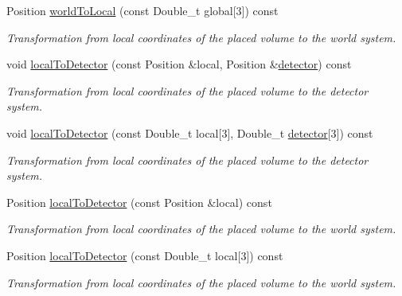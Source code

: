 \begin{DoxyCompactItemize}
Position \hyperlink{class_d_d4hep_1_1_alignments_1_1_alignment_data_af6e227ee69afb3dbf1d50463c12ec106}{world\+To\+Local} (const Double\+\_\+t global\mbox{[}3\mbox{]}) const
\begin{DoxyCompactList}\small\item\em Transformation from local coordinates of the placed volume to the world system. \end{DoxyCompactList}\item 
void \hyperlink{class_d_d4hep_1_1_alignments_1_1_alignment_data_a10d03e4422709e54e030a04836f3c08d}{local\+To\+Detector} (const Position \&local, Position \&\hyperlink{class_d_d4hep_1_1_alignments_1_1_alignment_data_abf7096d1f2d3ed307c361f2d6d03710e}{detector}) const
\begin{DoxyCompactList}\small\item\em Transformation from local coordinates of the placed volume to the detector system. \end{DoxyCompactList}\item 
void \hyperlink{class_d_d4hep_1_1_alignments_1_1_alignment_data_adc80cc9962e0e6209f0c7b9725123d94}{local\+To\+Detector} (const Double\+\_\+t local\mbox{[}3\mbox{]}, Double\+\_\+t \hyperlink{class_d_d4hep_1_1_alignments_1_1_alignment_data_abf7096d1f2d3ed307c361f2d6d03710e}{detector}\mbox{[}3\mbox{]}) const
\begin{DoxyCompactList}\small\item\em Transformation from local coordinates of the placed volume to the detector system. \end{DoxyCompactList}\item 
Position \hyperlink{class_d_d4hep_1_1_alignments_1_1_alignment_data_a686b7c5193c1d01d812b6d72f9a73c83}{local\+To\+Detector} (const Position \&local) const
\begin{DoxyCompactList}\small\item\em Transformation from local coordinates of the placed volume to the world system. \end{DoxyCompactList}\item 
Position \hyperlink{class_d_d4hep_1_1_alignments_1_1_alignment_data_aa3d9d7b8ae5bf3cc2916a2fbd4d12cc4}{local\+To\+Detector} (const Double\+\_\+t local\mbox{[}3\mbox{]}) const
\begin{DoxyCompactList}\small\item\em Transformation from local coordinates of the placed volume to the world system. \end{DoxyCompactList}\item 

\end{DoxyCompactItemize}
